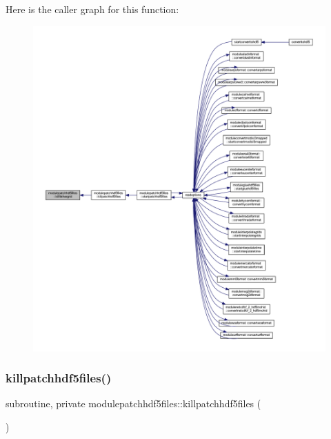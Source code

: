 Here is the caller graph for this function\+:\nopagebreak
\begin{figure}[H]
\begin{center}
\leavevmode
\includegraphics[width=350pt]{namespacemodulepatchhdf5files_a9cdefa24170268bd385859fedc04a136_icgraph}
\end{center}
\end{figure}
\mbox{\label{namespacemodulepatchhdf5files_a28038c83fc0a33bceb0c35f3e9ba08af}} 
\subsubsection{\texorpdfstring{killpatchhdf5files()}{killpatchhdf5files()}}
{\footnotesize\ttfamily subroutine, private modulepatchhdf5files\+::killpatchhdf5files (\begin{DoxyParamCaption}{ }\end{DoxyParamCaption})\hspace{0.3cm}{\ttfamily [private]}}


